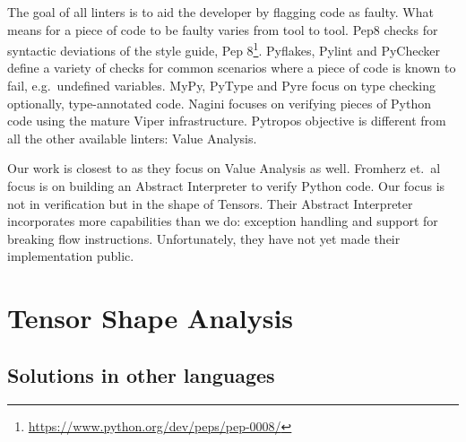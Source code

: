 The goal of all linters is to aid the developer by flagging code as faulty. What means for a
piece of code to be faulty varies from tool to tool. Pep8 checks for syntactic deviations
of the style guide, Pep 8\footnote{\url{https://www.python.org/dev/peps/pep-0008/}}.
Pyflakes, Pylint and PyChecker define a variety of checks for common scenarios where a
piece of code is known to fail, e.g.~undefined variables. MyPy, PyType and Pyre focus on
type checking optionally, type-annotated code. Nagini focuses on verifying pieces of Python
code using the mature Viper \autocite{muller_viper_2016} infrastructure. Pytropos
objective is different from all the other available linters: Value Analysis.

Our work is closest to \textcite{fromherz_static_2018} as they focus on Value Analysis as
well. Fromherz et.~al focus is on building an Abstract Interpreter to verify Python code.
Our focus is not in verification but in the shape of Tensors. Their Abstract Interpreter
incorporates more capabilities than we do: exception handling and support for breaking
flow instructions. Unfortunately, they have not yet made their implementation public.

\section{Tensor Shape Analysis}

%

\subsection{Solutions in other languages}

